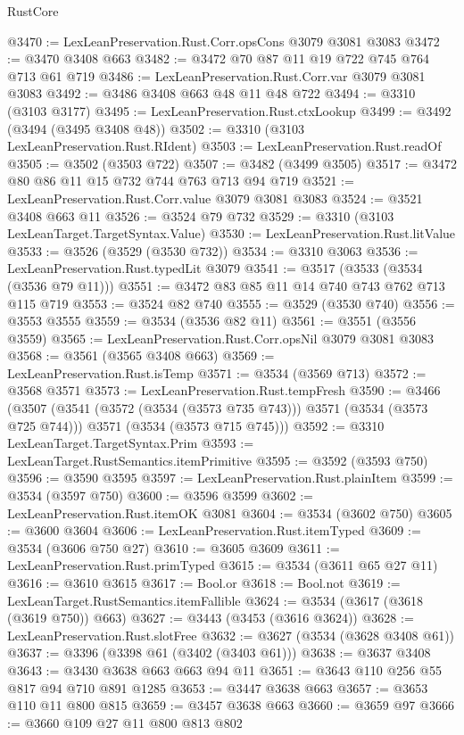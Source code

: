\begin{lexlean}{RustCore}
\begin{coremodule}
@3470 := LexLeanPreservation.Rust.Corr.opsCons @3079 @3081 @3083
@3472 := @3470 @3408 @663
@3482 := @3472 @70 @87 @11 @19 @722 @745 @764 @713 @61 @719
@3486 := LexLeanPreservation.Rust.Corr.var @3079 @3081 @3083
@3492 := @3486 @3408 @663 @48 @11 @48 @722
@3494 := @3310 (@3103 @3177)
@3495 := LexLeanPreservation.Rust.ctxLookup
@3499 := @3492 (@3494 (@3495 @3408 @48))
@3502 := @3310 (@3103 LexLeanPreservation.Rust.RIdent)
@3503 := LexLeanPreservation.Rust.readOf
@3505 := @3502 (@3503 @722)
@3507 := @3482 (@3499 @3505)
@3517 := @3472 @80 @86 @11 @15 @732 @744 @763 @713 @94 @719
@3521 := LexLeanPreservation.Rust.Corr.value @3079 @3081 @3083
@3524 := @3521 @3408 @663 @11
@3526 := @3524 @79 @732
@3529 := @3310 (@3103 LexLeanTarget.TargetSyntax.Value)
@3530 := LexLeanPreservation.Rust.litValue
@3533 := @3526 (@3529 (@3530 @732))
@3534 := @3310 @3063
@3536 := LexLeanPreservation.Rust.typedLit @3079
@3541 := @3517 (@3533 (@3534 (@3536 @79 @11)))
@3551 := @3472 @83 @85 @11 @14 @740 @743 @762 @713 @115 @719
@3553 := @3524 @82 @740
@3555 := @3529 (@3530 @740)
@3556 := @3553 @3555
@3559 := @3534 (@3536 @82 @11)
@3561 := @3551 (@3556 @3559)
@3565 := LexLeanPreservation.Rust.Corr.opsNil @3079 @3081 @3083
@3568 := @3561 (@3565 @3408 @663)
@3569 := LexLeanPreservation.Rust.isTemp
@3571 := @3534 (@3569 @713)
@3572 := @3568 @3571
@3573 := LexLeanPreservation.Rust.tempFresh
@3590 := @3466
    (@3507
      (@3541 (@3572 (@3534 (@3573 @735 @743))) @3571 (@3534 (@3573 @725 @744)))
      @3571
      (@3534 (@3573 @715 @745)))
@3592 := @3310 LexLeanTarget.TargetSyntax.Prim
@3593 := LexLeanTarget.RustSemantics.itemPrimitive
@3595 := @3592 (@3593 @750)
@3596 := @3590 @3595
@3597 := LexLeanPreservation.Rust.plainItem
@3599 := @3534 (@3597 @750)
@3600 := @3596 @3599
@3602 := LexLeanPreservation.Rust.itemOK @3081
@3604 := @3534 (@3602 @750)
@3605 := @3600 @3604
@3606 := LexLeanPreservation.Rust.itemTyped
@3609 := @3534 (@3606 @750 @27)
@3610 := @3605 @3609
@3611 := LexLeanPreservation.Rust.primTyped
@3615 := @3534 (@3611 @65 @27 @11)
@3616 := @3610 @3615
@3617 := Bool.or
@3618 := Bool.not
@3619 := LexLeanTarget.RustSemantics.itemFallible
@3624 := @3534 (@3617 (@3618 (@3619 @750)) @663)
@3627 := @3443 (@3453 (@3616 @3624))
@3628 := LexLeanPreservation.Rust.slotFree
@3632 := @3627 (@3534 (@3628 @3408 @61))
@3637 := @3396 (@3398 @61 (@3402 (@3403 @61)))
@3638 := @3637 @3408
@3643 := @3430 @3638 @663 @663 @94 @11
@3651 := @3643 @110 @256 @55 @817 @94 @710 @891 @1285
@3653 := @3447 @3638 @663
@3657 := @3653 @110 @11 @800 @815
@3659 := @3457 @3638 @663
@3660 := @3659 @97
@3666 := @3660 @109 @27 @11 @800 @813 @802

\end{coremodule}
\end{lexlean}
